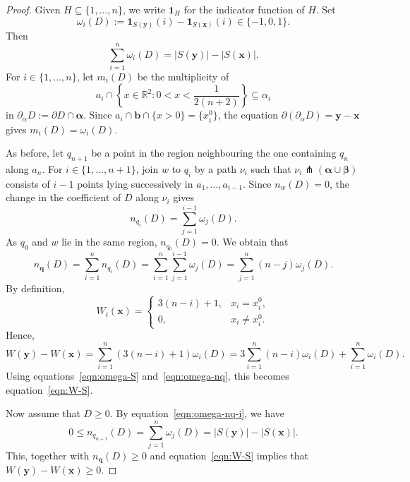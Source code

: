 \documentclass[10pt,a4paper]{amsart}
\newcommand{\as}{\boldsymbol{\alpha}}
\newcommand{\bR}{\mathbb{R}}
\newcommand{\bb}{\boldsymbol{b}}
\newcommand{\bs}{\boldsymbol{\beta}}
\newcommand{\one}{\boldsymbol{1}}
\newcommand{\qs}{\boldsymbol{q}}
\newcommand{\xs}{\boldsymbol{x}}
\newcommand{\ys}{\boldsymbol{y}}
\begin{document}
\begin{proof}
    Given $H \subseteq \{1,\dots,n\}$, we write $\one_H$ for the indicator function of $H$. Set
    \[
    \omega_i(D) := \one_{S(\ys)}(i) - \one_{S(\xs)}(i) \in \{-1,0,1\}.
    \]
    Then
    \begin{equation}\label{eqn:omega-S}
    \sum_{i=1}^n \omega_i(D) = |S(\ys)| - |S(\xs)|.
    \end{equation}
    For $i \in \{1,\dots,n\}$, let $m_i(D)$ be the multiplicity of 
    \[
    a_i \cap \left\{x \in \bR^2 : 0 < x < \frac{1}{2(n+2)}\right\} \subseteq \alpha_i
    \]
    in $\partial_\alpha D := \partial D \cap \as$. Since $a_i \cap \bb \cap \{x>0\} = \{x_i^0\}$, the equation $\partial(\partial_\alpha D) = \ys - \xs$ gives $m_i(D) = \omega_i(D)$.

    As before, let $q_{n+1}$ be a point in the region neighbouring the one containing $q_n$ along $a_n$. For $i \in \{1,\dots,n+1\}$, join $w$ to $q_i$ by a path $\nu_i$ such that $\nu_i \pitchfork (\as \cup \bs)$ consists of $i-1$ points lying successively in $a_1,\dots,a_{i-1}$. Since $n_w(D) = 0$, the change in the coefficient of $D$ along $\nu_i$ gives
    \begin{equation}\label{eqn:omega-nq-i}
    n_{q_i}(D) = \sum_{j=1}^{i-1} \omega_j(D).
    \end{equation}
    As $q_0$ and $w$ lie in the same region, $n_{q_0}(D) = 0$. We obtain that
    \begin{equation}\label{eqn:omega-nq}
    n_{\qs}(D) = \sum_{i=1}^n n_{q_i}(D) = \sum_{i=1}^n \sum_{j=1}^{i-1} \omega_j(D) = \sum_{j=1}^n (n-j)\omega_j(D).
    \end{equation}
    By definition,
    \[
    W_i(\xs) = 
    \begin{cases}
        3(n-i)+1, & x_i = x_i^0,\\
        0, & x_i \neq x_i^0.
    \end{cases}
    \]
    Hence,
    \[
    W(\ys) - W(\xs) = \sum_{i=1}^n (3(n-i)+1) \omega_i(D) = 3\sum_{i=1}^n (n-i)\omega_i(D) + \sum_{i=1}^n \omega_i(D).
    \]
    Using equations~\eqref{eqn:omega-S} and~\eqref{eqn:omega-nq}, this becomes equation~\eqref{eqn:W-S}.

    Now assume that $D \ge 0$. By equation~\eqref{eqn:omega-nq-i}, we have 
    \[
    0 \le n_{q_{n+1}}(D) = \sum_{j=1}^n \omega_j(D) = |S(\ys)| - |S(\xs)|. 
    \]
    This, together with $n_{\qs}(D) \ge 0$ and equation~\eqref{eqn:W-S} implies that $W(\ys) - W(\xs) \ge 0$.
\end{proof}
\end{document}
